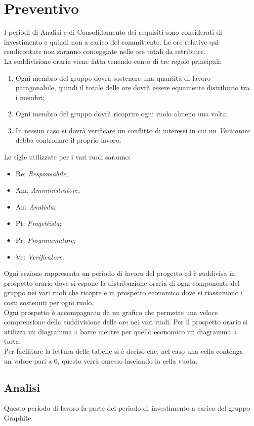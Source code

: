 \documentclass[./PianodiProgetto.tex]{subfiles}
\begin{document}
	
\chapter{Preventivo}
I periodi di Analisi e di Consolidamento dei requisiti sono considerati di investimento e quindi non a carico del committente. Le ore relative qui rendicontate non saranno conteggiate nelle ore totali da retribuire.\\
La suddivisione oraria viene fatta tenendo conto di tre regole principali:
\begin{enumerate}
\item Ogni membro del gruppo dovrà sostenere una quantità di lavoro paragonabile, quindi il totale delle ore dovrà essere equamente distribuito tra i membri;
\item Ogni membro del gruppo dovrà ricoprire ogni ruolo almeno una volta;
\item In nessun caso si dovrà verificare un conflitto di interessi in cui un \textit{Vericatore} debba controllare il proprio lavoro.
\end{enumerate}
Le sigle utilizzate per i vari ruoli saranno:
\begin{itemize}
\item Re: \textit{Responsabile};
\item Am: \textit{Amministratore};
\item An: \textit{Analista};
\item Pt: \textit{Progettista};
\item Pr: \textit{Programmatore};
\item Ve: \textit{Verificatore}.
\end{itemize}
\noindent Ogni sezione rappresenta un periodo di lavoro del progetto ed è suddivisa in prospetto orario dove si espone la distribuzione oraria di ogni componente del gruppo nei vari ruoli che ricopre e in prospetto economico dove si riassumono i costi sostenuti per ogni ruolo. \\
Ogni prospetto è accompagnato da un grafico che permette una veloce comprensione della suddivisione delle ore nei vari ruoli. Per il prospetto orario si utilizza un diagramma a barre mentre per quello economico un diagramma a torta.\\
\noindent Per facilitare la lettura delle tabelle si è deciso che, nel caso una cella contenga un valore pari a 0, questo verrà omesso lasciando la cella vuota.

\section{Analisi}
Questo periodo di lavoro fa parte del periodo di investimento a carico del gruppo Graphite.
\end{document}
